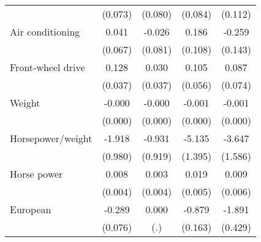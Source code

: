 \begin{table}[htbp]
\begin{tabular}{l*{4}{c}}
                                                   & (0.073)                                            & (0.080)         & (0.084)         & (0.112)          \\
        [1em]
        Air conditioning                           & 0.041                                              & -0.026          & 0.186\sym{*}    & -0.259\sym{*}    \\
                                                   & (0.067)                                            & (0.081)         & (0.108)         & (0.143)          \\
        [1em]
        Front-wheel drive                          & 0.128\sym{***}                                     & 0.030           & 0.105\sym{*}    & 0.087            \\
                                                   & (0.037)                                            & (0.037)         & (0.056)         & (0.074)          \\
        [1em]
        Weight                                     & -0.000\sym{**}                                     & -0.000          & -0.001\sym{***} & -0.001\sym{***}  \\
                                                   & (0.000)                                            & (0.000)         & (0.000)         & (0.000)          \\
        [1em]
        Horsepower/weight                          & -1.918\sym{*}                                      & -0.931          & -5.135\sym{***} & -3.647\sym{**}   \\
                                                   & (0.980)                                            & (0.919)         & (1.395)         & (1.586)          \\
        [1em]
        Horse power                                & 0.008\sym{**}                                      & 0.003           & 0.019\sym{***}  & 0.009            \\
                                                   & (0.004)                                            & (0.004)         & (0.005)         & (0.006)          \\
        [1em]
        European                                   & -0.289\sym{***}                                    & 0.000           & -0.879\sym{***} & -1.891\sym{***}  \\
                                                   & (0.076)                                            & (.)             & (0.163)         & (0.429)          \\

\end{tabular}
\end{table}
